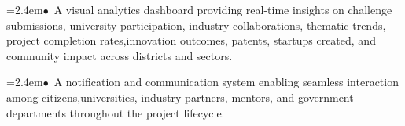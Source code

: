 \documentclass[10pt,a4paper]{article}
\begin{document}
\begin{tcolorbox}[pscard, title={"\textbf{SIH26043} \quad $\vert$ \quad A digital platform to crowdsource societal challenges and facilitate collab...}]
\noindent\hspace*{1.2em}\hangindent=2.4em\textcolor{sihblue}{$\bullet$}~\small A visual analytics dashboard providing real-time insights on challenge submissions, university participation, industry collaborations, thematic trends, project completion rates,innovation outcomes, patents, startups created, and community impact across districts and sectors.\par\vspace{0.05cm}
\noindent\hspace*{1.2em}\hangindent=2.4em\textcolor{sihblue}{$\bullet$}~\small A notification and communication system enabling seamless interaction among citizens,universities, industry partners, mentors, and government departments throughout the project lifecycle.\par\vspace{0.05cm}

\end{tcolorbox}
\vspace{0.4cm}
{}
\end{document}

